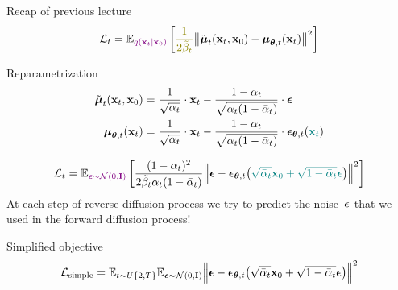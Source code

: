

\usepackage{tikz}

\usetikzlibrary{arrows,shapes,positioning,shadows,trees}

\begin{frame}
\titlepage
\end{frame}
\begin{frame}{Recap of previous lecture}
	\vspace{-0.3cm}
	\[
		\cL_t = \bbE_{\color{violet}q(\bx_t | \bx_0)} \left[ {\color{olive}\frac{1}{2\tilde{\beta}_t}} \bigl\| \tilde{\bmu}_t(\bx_t, \bx_0) - \bmu_{\btheta, t}(\bx_t) \bigr\|^2  \right]
	\]
	\vspace{-0.3cm}
	\begin{block}{Reparametrization}
		\vspace{-0.7cm}
		\begin{align*}
			\tilde{\boldsymbol{\mu}}_t(\mathbf{x}_t, \mathbf{x}_0) &= \frac{1}{\sqrt{\alpha_t}} \cdot \mathbf{x}_t - \frac{1 - \alpha_t}{\sqrt{\alpha_t (1 - \bar{\alpha}_t)}} \cdot \boldsymbol{\epsilon} \\
			\boldsymbol{\mu}_{\boldsymbol{\theta}, t}(\mathbf{x}_t) &= \frac{1}{\sqrt{\alpha_t}} \cdot \mathbf{x}_t - \frac{1 - \alpha_t}{\sqrt{\alpha_t (1 - \bar{\alpha}_t)}} \cdot \boldsymbol{\epsilon}_{\boldsymbol{\theta}, t}({\color{teal}\mathbf{x}_t})
		\end{align*}
		\vspace{-0.7cm}
	\end{block}
	\vspace{-0.2cm}
	\[
		\mathcal{L}_t  =	 \mathbb{E}_{\color{violet}\boldsymbol{\epsilon} \sim \mathcal{N}(0, \mathbf{I})} \left[ \frac{(1 - \alpha_t)^2}{2\tilde{\beta}_t \alpha_t (1 - \bar{\alpha}_t)} \Bigl\| \boldsymbol{\epsilon} - \boldsymbol{\epsilon}_{\boldsymbol{\theta}, t}\bigl( {\color{teal}\sqrt{\bar{\alpha}_t} \mathbf{x}_0 + \sqrt{1 - \bar{\alpha}_t} \boldsymbol{\epsilon}}\bigr) \Bigr\|^2 \right]
	\]
	At each step of reverse diffusion process we try to predict the noise~$\boldsymbol{\epsilon}$ that we used in the forward diffusion process!
	\begin{block}{Simplified objective}
		\vspace{-0.7cm}
		\[
			 \mathcal{L}_{\text{simple}} = \mathbb{E}_{t \sim U\{2, T\}} \mathbb{E}_{\boldsymbol{\epsilon} \sim \mathcal{N}(0, \mathbf{I})} \Bigl\| \boldsymbol{\epsilon} - \boldsymbol{\epsilon}_{\boldsymbol{\theta}, t}\bigl( \sqrt{\bar{\alpha}_t} \mathbf{x}_0 + \sqrt{1 - \bar{\alpha}_t} \boldsymbol{\epsilon}\bigr) \Bigr\|^2 
		\]
	\end{block}
\end{frame}
